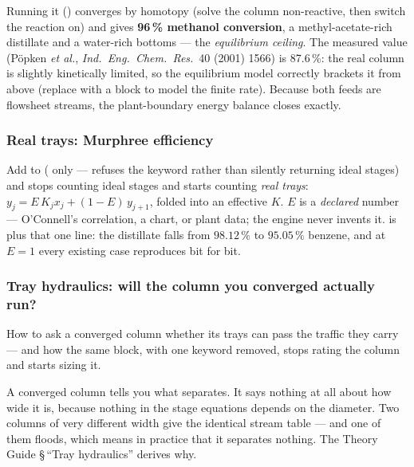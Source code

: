 \documentclass[11pt,a4paper]{article}
\begin{document}
Running it
()
converges by homotopy (solve the column non-reactive, then switch the
reaction on) and gives \textbf{96\,\% methanol conversion}, a
methyl-acetate-rich distillate and a water-rich bottoms --- the
\emph{equilibrium ceiling}.  The measured value (P\"opken \emph{et
al.}, \emph{Ind.\ Eng.\ Chem.\ Res.}\ 40 (2001) 1566) is 87.6\,\%: the
real column is slightly kinetically limited, so the equilibrium model
correctly brackets it from above (replace  with a
 block to model the finite rate).  Because both feeds
are flowsheet streams, the plant-boundary energy balance closes
exactly.

\subsubsection{Real trays: Murphree efficiency}\label{sec:murphree}

Add  to 
( only ---  refuses the keyword
rather than silently returning ideal stages) and  stops
counting ideal stages and starts counting \emph{real trays}:
$y_j = E\,K_j x_j + (1-E)\,y_{j+1}$, folded into an effective $K$.
$E$ is a \emph{declared} number --- O'Connell's correlation, a chart, or
plant data; the engine never invents it.   is
 plus that one line: the distillate falls from
$98.12\,\%$ to $95.05\,\%$ benzene, and at $E = 1$ every existing case
reproduces bit for bit.

\subsubsection{Tray hydraulics: will the column you converged actually run?}\label{sec:tray-hydraulics}

\begin{whatyoulllearn}
How to ask a converged column whether its trays can pass the traffic
they carry --- and how the same block, with one keyword removed, stops
rating the column and starts sizing it.
\end{whatyoulllearn}

A converged column tells you what separates.  It says nothing at all
about how wide it is, because nothing in the stage equations depends on
the diameter.  Two columns of very different width give the identical
stream table --- and one of them floods, which means in practice that it
separates nothing.  The Theory Guide \S\,``Tray hydraulics'' derives
why.
\end{document}

